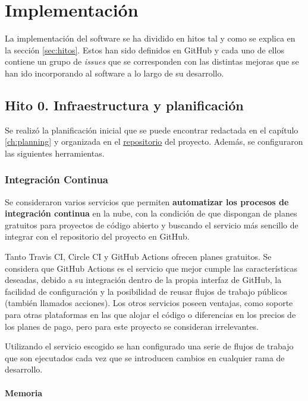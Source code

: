 \chapter{Implementación}

La implementación del software se ha dividido en hitos tal y como se explica en la sección \ref{sec:hitos}. Estos han sido definidos en GitHub
y cada uno de ellos contiene un grupo de \textit{issues} que se corresponden con las distintas
mejoras que se han ido incorporando al software a lo largo de su desarrollo.

\section{Hito 0. Infraestructura y planificación}

Se realizó la planificación inicial que se puede encontrar redactada en el capítulo \ref{ch:planning} y organizada en el \href{https://github.com/dipzza/ultrastar-song2txt}{repositorio} del proyecto. Además, se configuraron las siguientes herramientas.


\subsection{Integración Continua}

Se consideraron varios servicios que permiten \textbf{automatizar los procesos de integración continua} en la nube, con la condición de que dispongan de planes gratuitos para proyectos de código abierto y buscando el servicio más sencillo de integrar con el repositorio del proyecto en GitHub.

Tanto Travis CI,  Circle CI y GitHub Actions ofrecen planes gratuitos. Se considera que GitHub Actions es el servicio que mejor cumple las características deseadas, debido a su integración dentro de la propia interfaz de GitHub, la facilidad de configuración y la posibilidad de reusar flujos de trabajo públicos (también llamados acciones). Los otros servicios poseen ventajas, como soporte para otras plataformas en las que alojar el código o diferencias en los precios de los planes de pago, pero para este proyecto se consideran irrelevantes.

Utilizando el servicio escogido se han configurado una serie de flujos de trabajo que son ejecutados cada vez que se introducen cambios en cualquier rama de desarrollo.

\subsubsection{Memoria}

